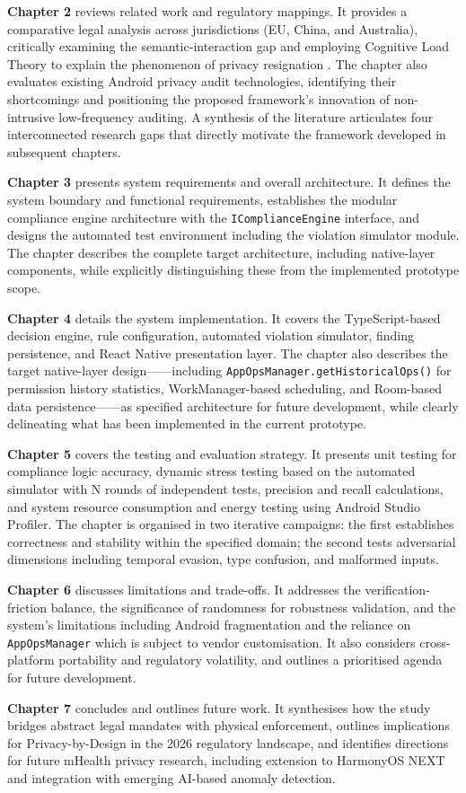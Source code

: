 \textbf{Chapter 2} reviews related work and regulatory mappings. It provides a comparative legal analysis across jurisdictions (EU, China, and Australia), critically examining the semantic-interaction gap and employing Cognitive Load Theory to explain the phenomenon of privacy resignation \cite{dehling2015, choi2018}. The chapter also evaluates existing Android privacy audit technologies, identifying their shortcomings and positioning the proposed framework's innovation of non-intrusive low-frequency auditing. A synthesis of the literature articulates four interconnected research gaps that directly motivate the framework developed in subsequent chapters.

\textbf{Chapter 3} presents system requirements and overall architecture. It defines the system boundary and functional requirements, establishes the modular compliance engine architecture with the \texttt{IComplianceEngine} interface, and designs the automated test environment including the violation simulator module. The chapter describes the complete target architecture, including native-layer components, while explicitly distinguishing these from the implemented prototype scope.

\textbf{Chapter 4} details the system implementation. It covers the TypeScript-based decision engine, rule configuration, automated violation simulator, finding persistence, and React Native presentation layer. The chapter also describes the target native-layer design——including \texttt{AppOpsManager.getHistoricalOps()} for permission history statistics, WorkManager-based scheduling, and Room-based data persistence——as specified architecture for future development, while clearly delineating what has been implemented in the current prototype.

\textbf{Chapter 5} covers the testing and evaluation strategy. It presents unit testing for compliance logic accuracy, dynamic stress testing based on the automated simulator with N rounds of independent tests, precision and recall calculations, and system resource consumption and energy testing using Android Studio Profiler. The chapter is organised in two iterative campaigns: the first establishes correctness and stability within the specified domain; the second tests adversarial dimensions including temporal evasion, type confusion, and malformed inputs.

\textbf{Chapter 6} discusses limitations and trade-offs. It addresses the verification-friction balance, the significance of randomness for robustness validation, and the system's limitations including Android fragmentation and the reliance on \texttt{AppOpsManager} which is subject to vendor customisation. It also considers cross-platform portability and regulatory volatility, and outlines a prioritised agenda for future development.

\textbf{Chapter 7} concludes and outlines future work. It synthesises how the study bridges abstract legal mandates with physical enforcement, outlines implications for Privacy-by-Design in the 2026 regulatory landscape, and identifies directions for future mHealth privacy research, including extension to HarmonyOS NEXT and integration with emerging AI-based anomaly detection.